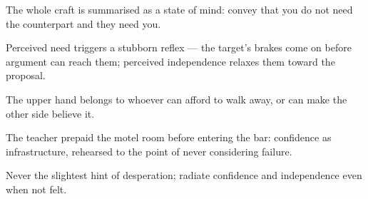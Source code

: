 

\begin{distilled}
  \item The whole craft is summarised as a state of mind: convey that you do not need the counterpart and they need you.
  \item Perceived need triggers a stubborn reflex --- the target's brakes come on before argument can reach them; perceived independence relaxes them toward the proposal.
  \item The upper hand belongs to whoever can afford to walk away, or can make the other side believe it.
  \item The teacher prepaid the motel room before entering the bar: confidence as infrastructure, rehearsed to the point of never considering failure.
  \item Never the slightest hint of desperation; radiate confidence and independence even when not felt.
\end{distilled}
